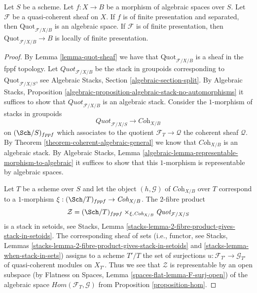 \begin{proposition}
\label{proposition-quot}
Let $S$ be a scheme. Let $f : X \to B$ be a morphism of algebraic
spaces over $S$. Let $\mathcal{F}$ be a quasi-coherent sheaf
on $X$. If $f$ is of finite presentation and separated, then
$\text{Quot}_{\mathcal{F}/X/B}$
is an algebraic space. If $\mathcal{F}$ is of finite presentation,
then $\text{Quot}_{\mathcal{F}/X/B} \to B$ is locally of finite presentation.
\end{proposition}

\begin{proof}
By Lemma \ref{lemma-quot-sheaf}
we have that $\text{Quot}_{\mathcal{F}/X/B}$ is a sheaf in the
fppf topology. Let $\textit{Quot}_{\mathcal{F}/X/B}$ be the stack in
groupoids corresponding to $\text{Quot}_{\mathcal{F}/X/S}$, see
Algebraic Stacks, Section \ref{algebraic-section-split}.
By Algebraic Stacks, Proposition
\ref{algebraic-proposition-algebraic-stack-no-automorphisms}
it suffices to show that $\textit{Quot}_{\mathcal{F}/X/B}$
is an algebraic stack.
Consider the $1$-morphism of stacks in groupoids
$$
\textit{Quot}_{\mathcal{F}/X/S}
\longrightarrow
\textit{Coh}_{X/B}
$$
on $(\Sch/S)_{fppf}$ which associates to the quotient
$\mathcal{F}_T \to \mathcal{Q}$ the coherent sheaf $\mathcal{Q}$.
By Theorem \ref{theorem-coherent-algebraic-general} we know that
$\textit{Coh}_{X/B}$ is an algebraic stack.
By Algebraic Stacks, Lemma
\ref{algebraic-lemma-representable-morphism-to-algebraic}
it suffices to show that this $1$-morphism is representable
by algebraic spaces.

\medskip\noindent
Let $T$ be a scheme over $S$ and let the object $(h, \mathcal{G})$ of
$\textit{Coh}_{X/B}$ over $T$ correspond
to a $1$-morphism $\xi : (\Sch/T)_{fppf} \to \textit{Coh}_{X/B}$.
The $2$-fibre product
$$
\mathcal{Z} =
(\Sch/T)_{fppf}
\times_{\xi, \textit{Coh}_{X/B}}
\textit{Quot}_{\mathcal{F}/X/S}
$$
is a stack in setoids, see
Stacks, Lemma \ref{stacks-lemma-2-fibre-product-gives-stack-in-setoids}.
The corresponding sheaf of sets (i.e., functor, see
Stacks, Lemmas
\ref{stacks-lemma-2-fibre-product-gives-stack-in-setoids} and
\ref{stacks-lemma-when-stack-in-sets}) assigns to a scheme
$T'/T$ the set of surjections $u : \mathcal{F}_{T'} \to \mathcal{G}_{T'}$
of quasi-coherent modules on $X_{T'}$. Thus we see that
$\mathcal{Z}$ is representable by an open subspace
(by Flatness on Spaces, Lemma \ref{spaces-flat-lemma-F-surj-open})
of the algebraic space
$\mathit{Hom}(\mathcal{F}_T, \mathcal{G})$ from
Proposition \ref{proposition-hom}.
\end{proof}


